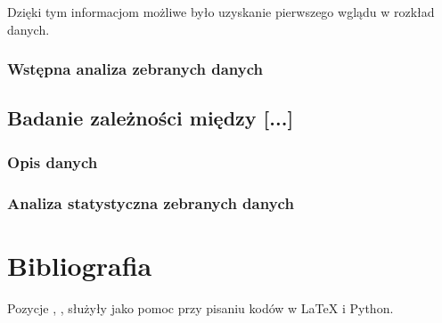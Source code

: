 \documentclass[12pt,a4paper]{article}
\begin{document}
Dzięki tym informacjom możliwe było uzyskanie pierwszego wglądu w rozkład danych.

\newpage
\subsubsection{Wstępna analiza zebranych danych}





\newpage
\subsection{Badanie zależności między [...]}
\subsubsection{Opis danych}
\subsubsection{Analiza statystyczna zebranych danych}


\newpage


\section{Bibliografia}

Pozycje \cite{gitkkozlowski}, \cite{pandas}, \cite{statsmodels} służyły jako pomoc przy pisaniu kodów w LaTeX i Python.


\end{document}
